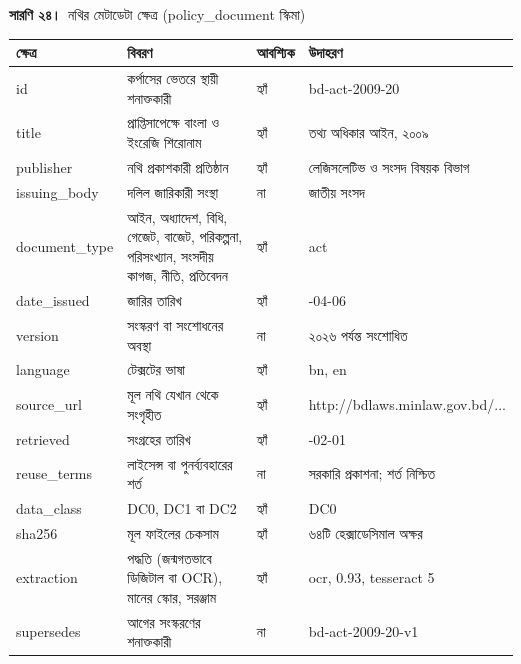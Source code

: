 \documentclass[border=10pt]{standalone}
\begin{document}
\begin{minipage}{17cm}
{\large\bfseries সারণি ২৪।}\ {\large নথির মেটাডেটা ক্ষেত্র (policy\_document স্কিমা)}\par\vspace{7pt}
\small
{}
\begin{tabularx}{\linewidth}{@{}>{\hsize=0.762\hsize\raggedright\arraybackslash}X>{\hsize=1.667\hsize\raggedright\arraybackslash}X>{\hsize=0.429\hsize\raggedright\arraybackslash}X>{\hsize=1.143\hsize\raggedright\arraybackslash}X@{}}
\arrayrulecolor{bapilrule}\toprule
\rowcolor{white}\textbf{ক্ষেত্র} & \textbf{বিবরণ} & \textbf{আবশ্যিক} & \textbf{উদাহরণ} \\
\midrule
id & কর্পাসের ভেতরে স্থায়ী শনাক্তকারী & হ্যাঁ & bd-act-2009-20 \\
title & প্রাপ্তিসাপেক্ষে বাংলা ও ইংরেজি শিরোনাম & হ্যাঁ & তথ্য অধিকার আইন, ২০০৯ \\
publisher & নথি প্রকাশকারী প্রতিষ্ঠান & হ্যাঁ & লেজিসলেটিভ ও সংসদ বিষয়ক বিভাগ \\
issuing\_body & দলিল জারিকারী সংস্থা & না & জাতীয় সংসদ \\
document\_type & আইন, অধ্যাদেশ, বিধি, গেজেট, বাজেট, পরিকল্পনা, পরিসংখ্যান, সংসদীয় কাগজ, নীতি, প্রতিবেদন & হ্যাঁ & act \\
date\_issued & জারির তারিখ & হ্যাঁ & 2009-04-06 \\
version & সংস্করণ বা সংশোধনের অবস্থা & না & ২০২৬ পর্যন্ত সংশোধিত \\
language & টেক্সটের ভাষা & হ্যাঁ & bn, en \\
source\_url & মূল নথি যেখান থেকে সংগৃহীত & হ্যাঁ & http:/\allowbreak{}/\allowbreak{}bdlaws.minlaw.gov.bd/\allowbreak{}... \\
retrieved & সংগ্রহের তারিখ & হ্যাঁ & 2027-02-01 \\
reuse\_terms & লাইসেন্স বা পুনর্ব্যবহারের শর্ত & না & সরকারি প্রকাশনা; শর্ত নিশ্চিত \\
data\_class & DC0, DC1 বা DC2 & হ্যাঁ & DC0 \\
sha256 & মূল ফাইলের চেকসাম & হ্যাঁ & ৬৪টি হেক্সাডেসিমাল অক্ষর \\
extraction & পদ্ধতি (জন্মগতভাবে ডিজিটাল বা OCR), মানের স্কোর, সরঞ্জাম & হ্যাঁ & ocr, 0.93, tesseract 5 \\
supersedes & আগের সংস্করণের শনাক্তকারী & না & bd-act-2009-20-v1 \\
\bottomrule
\end{tabularx}
\par{}
\par{}
\end{minipage}
\end{document}
